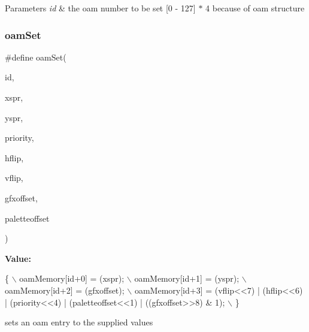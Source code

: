 \begin{DoxyParams}{Parameters}
{\em id} & the oam number to be set \mbox{[}0 -\/ 127\mbox{]} $\ast$ 4 because of oam structure \\
\hline
\end{DoxyParams}
\mbox{\label{a00350_a2f62a591672b786d90ebb03fdf25f159}} 
\subsubsection{\texorpdfstring{oam\+Set}{oamSet}}
{\footnotesize\ttfamily \#define oam\+Set(\begin{DoxyParamCaption}\item[{}]{id,  }\item[{}]{xspr,  }\item[{}]{yspr,  }\item[{}]{priority,  }\item[{}]{hflip,  }\item[{}]{vflip,  }\item[{}]{gfxoffset,  }\item[{}]{paletteoffset }\end{DoxyParamCaption})}

{\bfseries Value\+:}
\begin{DoxyCode}
\{ \(\backslash\)
    oamMemory[\textcolor{keywordtype}{id}+0] = (xspr); \(\backslash\)
    oamMemory[\textcolor{keywordtype}{id}+1] = (yspr); \(\backslash\)
    oamMemory[\textcolor{keywordtype}{id}+2] = (gfxoffset); \(\backslash\)
    oamMemory[\textcolor{keywordtype}{id}+3] = (vflip<<7) | (hflip<<6) | (priority<<4) | (paletteoffset<<1) | ((gfxoffset>>8) & 1); 
      \(\backslash\)
    \}
\end{DoxyCode}


sets an oam entry to the supplied values 


